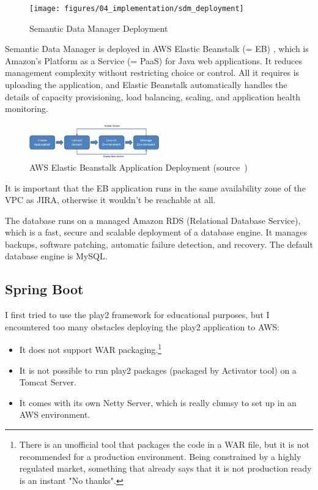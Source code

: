 \begin{figure}[!ht]
	\centering
	\texttt{[image: figures/04\_implementation/sdm\_deployment]}
    \caption{Semantic Data Manager Deployment}
\end{figure}

Semantic Data Manager is deployed in AWS Elastic Beanstalk (= EB) \cite{vliet2011elastic}, which is Amazon's Platform as a Service (= PaaS) for Java web applications. It reduces management complexity without restricting choice or control. All it requires is uploading the application, and Elastic Beanstalk automatically handles the details of capacity provisioning, load balancing, scaling, and application health monitoring.

\newpage

\begin{figure}[!ht]
	\centering
	\includegraphics[width=0.5\textwidth]{figures/04_implementation/eb_flowchart}
    \caption[AWS Elastic Beanstalk Application Deployment]{AWS Elastic Beanstalk Application Deployment (source~\protect\cite{elasticbeanstalk})}
\end{figure}

It is important that the EB application runs in the same availability zone of the VPC as JIRA, otherwise it wouldn't be reachable at all.

The database runs on a managed Amazon RDS (Relational Database Service), which is a fast, secure and scalable deployment of a database engine. It manages backups, software patching, automatic failure detection, and recovery. The default database engine is MySQL.

\subsection{Spring Boot}

I first tried to use the play2 framework for educational purposes, but I encountered too many obstacles deploying the play2 application to AWS: 

\begin{itemize}
	\item It does not support WAR packaging.\footnote{There is an unofficial tool that packages the code in a WAR file, but it is not recommended for a production environment. Being constrained by a highly regulated market, something that already says that it is not production ready is an instant "No thanks".}
	\item It is not possible to run play2 packages (packaged by Activator tool) on a Tomcat Server.
	\item It comes with its own Netty Server, which is really clumsy to set up in an AWS environment.
\end{itemize}

